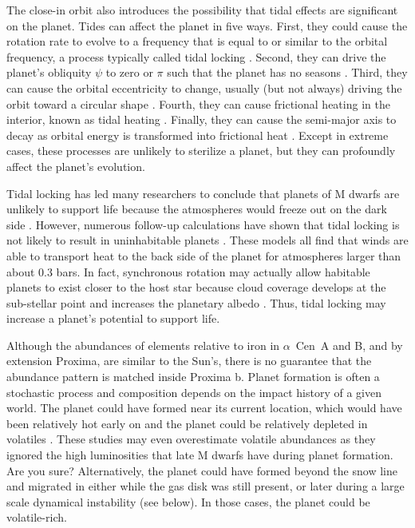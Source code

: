 \documentclass[preprint,12pt]{aastex}
\newcommand{\xxx}[1]{{\color{red} #1}} %
\def\acen{{$\alpha$~Cen}}
\begin{document}
The close-in orbit also introduces the possibility that tidal effects
are significant on the planet. Tides can affect the planet in five
ways. First, they could cause the rotation rate to evolve to a
frequency that is equal to or similar to the orbital frequency, a
process typically called tidal locking
\citep{Dole64,Kasting93,Barnes16}. Second, they can drive the planet's
obliquity $\psi$ to zero or $\pi$ such that the planet has no seasons
\citep{Heller11}. Third, they can cause the orbital eccentricity to
change, usually (but not always) driving the orbit toward a circular
shape \citep{Darwin1880}. Fourth, they can cause frictional heating in
the interior, known as tidal heating
\citep{Peale79,Jackson08c,Barnes13}. Finally, they can cause the
semi-major axis to decay as orbital energy is transformed into
frictional heat \citep{Darwin1880,Barnes08}. Except in extreme cases,
these processes are unlikely to sterilize a planet, but they can
profoundly affect the planet's evolution.

Tidal locking has led many researchers to conclude that planets of M
dwarfs are unlikely to support life because the atmospheres would
freeze out on the dark side \citep{Kasting93}. However, numerous
follow-up calculations have shown that tidal locking is not likely to
result in uninhabitable planets
\citep{Joshi97,Pierrehumbert11,Wordsworth11,Yang13,Shields16}. These
models all find that winds are able to transport heat to the back side
of the planet for atmospheres larger than about 0.3 bars. In fact,
synchronous rotation may actually allow habitable planets to exist
closer to the host star because cloud coverage develops at the
sub-stellar point and increases the planetary albedo
\citep{Yang13}. Thus, tidal locking may increase a planet's potential
to support life.

Although the abundances of elements relative to iron in \acen~A and B,
and by extension Proxima, are similar to the Sun's, there is no
guarantee that the abundance pattern is matched inside Proxima
b. Planet formation is often a stochastic process and composition
depends on the impact history of a given world. The planet could have
formed near its current location, which would have been relatively hot
early on and the planet could be relatively depleted in volatiles
\citep{Raymond07,Mulders15}. These studies may even overestimate
volatile abundances as they ignored the high luminosities that late M
dwarfs have during planet formation. \xxx{Are you sure?} Alternatively, the planet could
have formed beyond the snow line and migrated in either while the gas
disk was still present, or later during a large scale dynamical
instability (see below). In those cases, the planet could be
volatile-rich.
\end{document}

